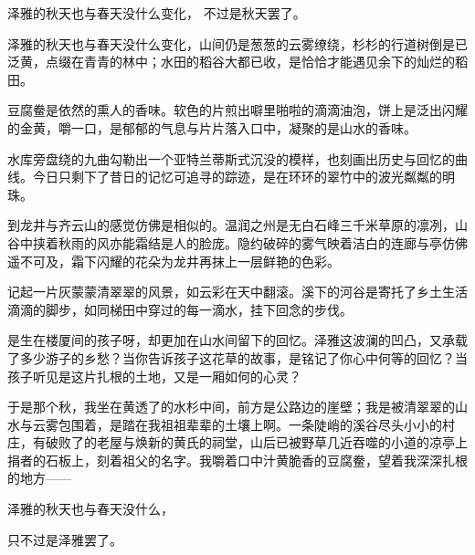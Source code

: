 \documentclass{ctexart}
\begin{document}
\epigraph{
    泽雅的秋天也与春天没什么变化，
    不过是秋天罢了。
}{}

泽雅的秋天也与春天没什么变化，山间仍是葱葱的云雾缭绕，杉杉的行道树倒是已泛黄，点缀在青青的林中；水田的稻谷大都已收，是恰恰才能遇见余下的灿烂的稻田。

豆腐鲞是依然的熏人的香味。软色的片煎出噼里啪啦的滴滴油泡，饼上是泛出闪耀的金黄，嚼一口，是郁郁的气息与片片落入口中，凝聚的是山水的香味。

水库旁盘绕的九曲勾勒出一个亚特兰蒂斯式沉没的模样，也刻画出历史与回忆的曲线。今日只剩下了昔日的记忆可追寻的踪迹，是在环环的翠竹中的波光粼粼的明珠。

到龙井与齐云山的感觉仿佛是相似的。温润之州是无白石峰三千米草原的凛冽，山谷中挟着秋雨的风亦能霜结是人的脸庞。隐约破碎的雾气映着洁白的连廊与亭仿佛遥不可及，霜下闪耀的花朵为龙井再抹上一层鲜艳的色彩。

记起一片灰蒙蒙清翠翠的风景，如云彩在天中翻滚。溪下的河谷是寄托了乡土生活滴滴的脚步，如同梯田中穿过的每一滴水，挂下回念的步伐。

是生在楼厦间的孩子呀，却更加在山水间留下的回忆。泽雅这波澜的凹凸，又承载了多少游子的乡愁？当你告诉孩子这花草的故事，是铭记了你心中何等的回忆？当孩子听见是这片扎根的土地，又是一厢如何的心灵？

于是那个秋，我坐在黄透了的水杉中间，前方是公路边的崖壁；我是被清翠翠的山水与云雾包围着，是踏在我祖祖辈辈的土壤上啊。一条陡峭的溪谷尽头小小的村庄，有破败了的老屋与焕新的黄氏的祠堂，山后已被野草几近吞噬的小道的凉亭上捐者的石板上，刻着祖父的名字。我嚼着口中汁黄脆香的豆腐鲞，望着我深深扎根的地方——

泽雅的秋天也与春天没什么，

只不过是泽雅罢了。
\end{document}
